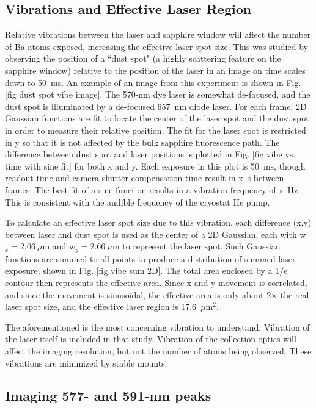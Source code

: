 \subsection{Vibrations and Effective Laser Region}

Relative vibrations between the laser and sapphire window will affect the number of Ba atoms exposed, increasing the effective laser spot size.  This was studied by observing the position of a ``dust spot" (a highly scattering feature on the sapphire window) relative to the position of the laser in an image on time scales down to 50~ms.  An example of an image from this experiment is shown in Fig. [fig dust spot vibe image].  The 570-nm dye laser is somewhat de-focused, and the dust spot is illuminated by a de-focused {\color{red}657~nm} diode laser. For each frame, 2D Gaussian functions are fit to locate the center of the laser spot and the dust spot in order to measure their relative position.  The fit for the laser spot is restricted in y so that it is not affected by the bulk sapphire fluorescence path.  The difference between dust spot and laser positions is plotted in Fig. [fig vibe vs. time with sine fit] for both x and y.  Each exposure in this plot is 50~ms, though readout time and camera shutter compensation time result in x~s between frames.  The best fit of a sine function results in a vibration frequency of x~Hz.  This is consistent with the audible frequency of the cryostat He pump.

To calculate an effective laser spot size due to this vibration, each difference (x,y) between laser and dust spot is used as the center of a 2D Gaussian, each with w$_{x} = 2.06~\mu$m and w$_{y} = 2.66~\mu$m to represent the laser spot.  Such Gaussian functions are summed to all points to produce a distribution of summed laser exposure, shown in Fig. [fig vibe sum 2D].  The total area enclosed by a 1/e contour then represents the effective area.  Since x and y movement is correlated, and since the movement is sinusoidal, the effective area is only about 2$\times$ the real laser spot size, and the effective laser region is {\color{red}17.6}~$\mu$m$^{2}$.

The aforementioned is the most concerning vibration to understand.  Vibration of the laser itself is included in that study.  Vibration of the collection optics will affect the imaging resolution, but not the number of atoms being observed.  These vibrations are minimized by stable mounts.

\subsection{Imaging 577- and 591-nm peaks}

